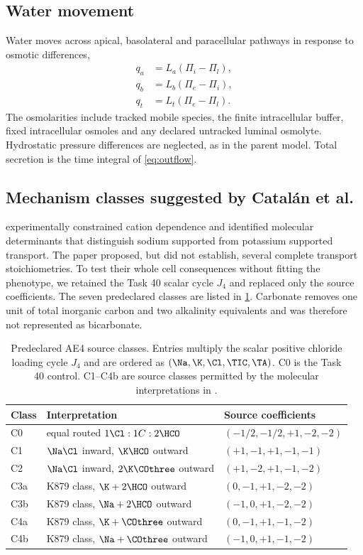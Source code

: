 \subsection{Water movement}

Water moves across apical, basolateral and paracellular pathways in response to osmotic differences,
\begin{align*}
q_a&=L_a(\Pi_i-\Pi_l),\\
q_b&=L_b(\Pi_e-\Pi_i),\\
q_t&=L_t(\Pi_e-\Pi_l).
\end{align*}
The osmolarities include tracked mobile species, the finite intracellular buffer, fixed intracellular osmoles and any declared untracked luminal osmolyte. Hydrostatic pressure differences are neglected, as in the parent model. Total secretion is the time integral of \cref{eq:outflow}.

\subsection{Mechanism classes suggested by Catalán et al.}

\citet{Catalan2025} experimentally constrained cation dependence and identified molecular determinants that distinguish sodium supported from potassium supported transport. The paper proposed, but did not establish, several complete transport stoichiometries. To test their whole cell consequences without fitting the phenotype, we retained the Task 40 scalar cycle $J_4$ and replaced only the source coefficients. The seven predeclared classes are listed in \cref{tab:classes}. Carbonate removes one unit of total inorganic carbon and two alkalinity equivalents and was therefore not represented as bicarbonate.

\begin{table}[t]
\centering
\caption{Predeclared AE4 source classes. Entries multiply the scalar positive chloride loading cycle $J_4$ and are ordered as $(\Na,\K,\Cl,\TIC,\TA)$. C0 is the Task 40 control. C1--C4b are source classes permitted by the molecular interpretations in \citet{Catalan2025}.}
\label{tab:classes}
\begin{tabular}{lll}
\toprule
Class & Interpretation & Source coefficients \\
\midrule
C0 & equal routed $1\Cl:1C:2\HCO$ & $(-1/2,-1/2,+1,-2,-2)$ \\
C1 & $\Na\Cl$ inward, $\K\HCO$ outward & $(+1,-1,+1,-1,-1)$ \\
C2 & $\Na\Cl$ inward, $2\K\COthree$ outward & $(+1,-2,+1,-1,-2)$ \\
C3a & K879 class, $\K+2\HCO$ outward & $(0,-1,+1,-2,-2)$ \\
C3b & K879 class, $\Na+2\HCO$ outward & $(-1,0,+1,-2,-2)$ \\
C4a & K879 class, $\K+\COthree$ outward & $(0,-1,+1,-1,-2)$ \\
C4b & K879 class, $\Na+\COthree$ outward & $(-1,0,+1,-1,-2)$ \\
\bottomrule
\end{tabular}
\end{table}

